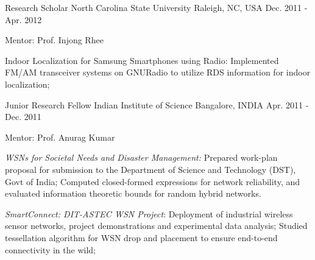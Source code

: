 \begin{cventries}
  \cventry
    {Research Scholar} %
    {North Carolina State University} %
    {Raleigh, NC, USA} %
    {Dec. 2011 - Apr. 2012} %
    {
      \begin{cvitems} %
    \item {Mentor: Prof. Injong Rhee}
    \item {Indoor Localization for Samsung Smartphones using Radio: Implemented FM/AM transceiver systems on GNURadio to utilize RDS information for indoor localization;}
      \end{cvitems}
    }
    
  \cventry
    {Junior Research Fellow} %
    {Indian Institute of Science} %
    {Bangalore, INDIA} %
    {Apr. 2011 - Dec. 2011} %
    {
      \begin{cvitems} %
    \item {Mentor: Prof. Anurag Kumar}
    \item {\emph{WSNs for Societal Needs and Disaster Management:} Prepared work-plan proposal for submission to the Department of Science and Technology (DST), Govt of India; Computed closed-formed expressions for network reliability, and evaluated information theoretic bounds for random hybrid networks.}
    \item {\emph{SmartConnect: DIT-ASTEC WSN Project}: Deployment of industrial wireless sensor networks, project demonstrations and experimental data analysis; Studied tessellation algorithm for WSN drop and placement to ensure end-to-end connectivity in the wild;}
      \end{cvitems}
    }



\end{cventries}
